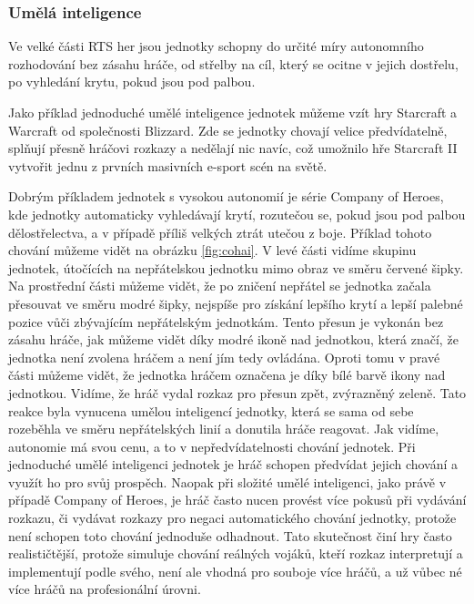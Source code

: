 \subsubsection{Umělá inteligence}

Ve velké části RTS her jsou jednotky schopny do určité míry autonomního rozhodování bez zásahu hráče, od střelby na cíl, který se ocitne v jejich dostřelu, po vyhledání krytu, pokud jsou pod palbou. 

Jako příklad jednoduché umělé inteligence jednotek můžeme vzít hry Starcraft a Warcraft od společnosti Blizzard. Zde se jednotky chovají velice předvídatelně, splňují přesně hráčovi rozkazy a nedělají nic navíc, což umožnilo hře Starcraft II vytvořit jednu z prvních masivních e-sport scén na světě. \citep{site:gamasutra01}



Dobrým příkladem jednotek s vysokou autonomií je série Company of Heroes, kde jednotky automaticky vyhledávají krytí, rozutečou se, pokud jsou pod palbou dělostřelectva, a v případě příliš velkých ztrát utečou z boje. Příklad tohoto chování můžeme vidět na obrázku \ref{fig:cohai}. V levé části vidíme skupinu jednotek, útočících na nepřátelskou jednotku mimo obraz ve směru červené šipky. Na prostřední části můžeme vidět, že po zničení nepřátel se jednotka začala přesouvat ve směru modré šipky, nejspíše pro získání lepšího krytí a lepší palebné pozice vůči zbývajícím nepřátelským jednotkám. Tento přesun je vykonán bez zásahu hráče, jak můžeme vidět díky modré ikoně nad jednotkou, která značí, že jednotka není zvolena hráčem a není jím tedy ovládána. Oproti tomu v pravé části můžeme vidět, že jednotka hráčem označena je díky bílé barvě ikony nad jednotkou. Vidíme, že hráč vydal rozkaz pro přesun zpět, zvýrazněný zeleně. Tato reakce byla vynucena umělou inteligencí jednotky, která se sama od sebe rozeběhla ve směru nepřátelských linií a donutila hráče reagovat. Jak vidíme, autonomie má svou cenu, a to v nepředvídatelnosti chování jednotek. Při jednoduché umělé inteligenci jednotek je hráč schopen předvídat jejich chování a využít ho pro svůj prospěch. Naopak při složité umělé inteligenci, jako právě v případě Company of Heroes, je hráč často nucen provést více pokusů při vydávání rozkazu, či vydávat rozkazy pro negaci automatického chování jednotky, protože není schopen toto chování jednoduše odhadnout. Tato skutečnost činí hry často realističtější, protože simuluje chování reálných vojáků, kteří rozkaz interpretují a implementují podle svého, není ale vhodná pro souboje více hráčů, a už vůbec né více hráčů na profesionální úrovni.

